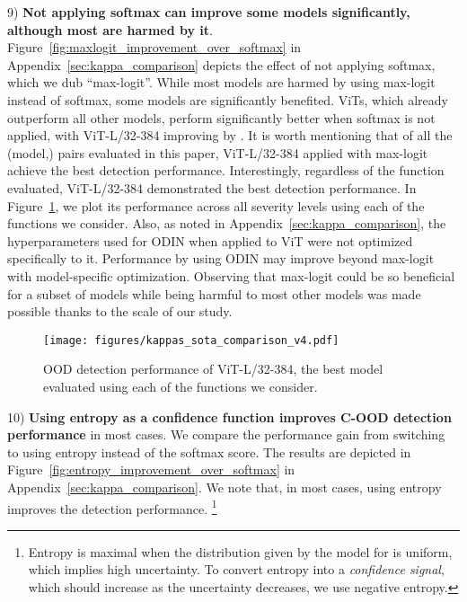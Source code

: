 \documentclass[table]{article} \usepackage{PRIMEarxiv}
\begin{document}
9) \textbf{Not applying softmax can improve some models significantly, although most are harmed by it}.
Figure~\ref{fig:maxlogit_improvement_over_softmax} in Appendix~\ref{sec:kappa_comparison} depicts the effect of not applying softmax, which we dub ``max-logit''. While most models are harmed by using max-logit instead of softmax, some models are significantly benefited. ViTs, which already outperform all other models, perform significantly better when softmax is not applied, with \textcolor{myteal}{ViT-L/32-384} improving by .
It is worth mentioning that of all the (model,) pairs evaluated in this paper, \textcolor{myteal}{ViT-L/32-384} applied with max-logit achieve the best detection performance. Interestingly, regardless of the  function evaluated, \textcolor{myteal}{ViT-L/32-384} demonstrated the best detection performance. In Figure~\ref{fig:mean_kappa_comparison}, we plot its performance across all severity levels using each of the  functions we consider. Also, as noted in Appendix~\ref{sec:kappa_comparison}, the hyperparameters used for ODIN when applied to ViT were not optimized specifically to it. Performance by using ODIN may improve beyond max-logit with model-specific optimization.
Observing that max-logit could be so beneficial for a subset of models while being harmful to most other models was made possible thanks to the scale of our study.
\begin{figure}[h]
    \centering
    \texttt{[image: figures/kappas\_sota\_comparison\_v4.pdf]}
    \caption{OOD detection performance of ViT-L/32-384, the best model evaluated using each of the  functions we consider. }
    \label{fig:mean_kappa_comparison}
\end{figure}

10) \textbf{Using entropy as a confidence function  improves C-OOD detection performance} in most cases.
We compare the performance gain from switching to using entropy instead of the softmax  score. The results are depicted in Figure~\ref{fig:entropy_improvement_over_softmax} in Appendix~\ref{sec:kappa_comparison}. We note that, in most cases, using entropy improves the detection performance.
\footnote{Entropy is maximal when the distribution given by the model for  is uniform, which implies high uncertainty. To convert entropy into a \emph{confidence signal}, which should increase as the uncertainty decreases, we use negative entropy.}
\end{document}
